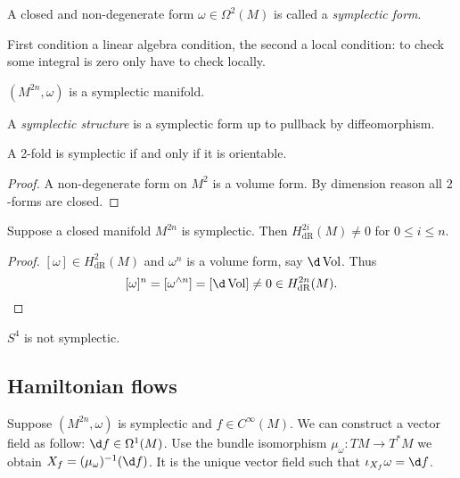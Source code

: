 \documentclass[a4paper]{article}
\newcommand{\w}{\wedge} %
\DeclareMathOperator{\Vol}{Vol} %
\begin{document}
\begin{definition}
  A closed and non-degenerate form \(\omega \in \Omega^2(M)\) is called a \emph{symplectic form}.
\end{definition}
First condition a linear algebra condition, the second a local condition: to check some integral is zero only have to check locally.

\begin{definition}
  \((M^{2n}, \omega)\) is a symplectic manifold.
\end{definition}

\begin{definition}
  A \emph{symplectic structure} is a symplectic form up to pullback by diffeomorphism.
\end{definition}

\begin{proposition}
  A 2-fold is symplectic if and only if it is orientable.
\end{proposition}

\begin{proof}
  A non-degenerate form on \(M^2\) is a volume form. By dimension reason all \(2\)-forms are closed.
\end{proof}

\begin{proposition}
  Suppose a closed manifold \(M^{2n}\) is symplectic. Then \(H^{2i}_{\text{dR}}(M) \ne 0\) for \(0 \leq i \leq n\).
\end{proposition}

\begin{proof}
  \([\omega] \in H^2_{\text{dR}}(M)\) and \(\omega^n\) is a volume form, say \(\d \Vol\). Thus
  \[
    [\omega]^n = [\omega^{\w n}] = [\d \Vol] \ne 0 \in H^{2n}_{\text{dR}}(M).
  \]
\end{proof}

\begin{eg}
  \(S^4\) is not symplectic.
\end{eg}

\subsection{Hamiltonian flows}

Suppose \((M^{2n}, \omega)\) is symplectic and \(f \in C^\infty(M)\). We can construct a vector field as follow: \(\d f \in \Omega^1(M)\). Use the bundle isomorphism \(\mu_\omega: TM \to T^*M\) we obtain \(X_f = (\mu_\omega)^{-1}(\d f)\). It is the unique vector field such that \(\iota_{X_f} \omega = \d f\).
\end{document}
